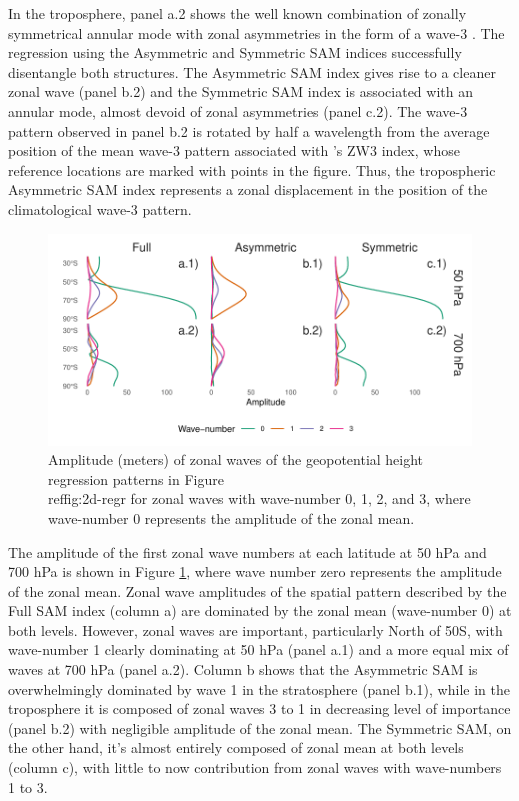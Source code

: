 \documentclass[smallextended]{svjour3}       %
\begin{document}
In the troposphere, panel a.2 shows the well known combination of zonally symmetrical annular mode with zonal asymmetries in the form of a wave-3 \citep{fogt2012}. The regression using the Asymmetric and Symmetric SAM indices successfully disentangle both structures. The Asymmetric SAM index gives rise to a cleaner zonal wave (panel b.2) and the Symmetric SAM index is associated with an annular mode, almost devoid of zonal asymmetries (panel c.2). The wave-3 pattern observed in panel b.2 is rotated by half a wavelength from the average position of the mean wave-3 pattern associated with \citet{raphael2004}'s ZW3 index, whose reference locations are marked with points in the figure. Thus, the tropospheric Asymmetric SAM index represents a zonal displacement in the position of the climatological wave-3 pattern.

\begin{figure}
\includegraphics{wave-amplitude-1} \caption{Amplitude (meters) of zonal waves of the geopotential height regression patterns in Figure \\ref{fig:2d-regr} for zonal waves with wave-number 0, 1, 2, and 3, where wave-number 0 represents the amplitude of the zonal mean.}\label{fig:wave-amplitude}
\end{figure}

The amplitude of the first zonal wave numbers at each latitude at 50 hPa and 700 hPa is shown in Figure \ref{fig:wave-amplitude}, where wave number zero represents the amplitude of the zonal mean. Zonal wave amplitudes of the spatial pattern described by the Full SAM index (column a) are dominated by the zonal mean (wave-number 0) at both levels. However, zonal waves are important, particularly North of 50\degree S, with wave-number 1 clearly dominating at 50 hPa (panel a.1) and a more equal mix of waves at 700 hPa (panel a.2). Column b shows that the Asymmetric SAM is overwhelmingly dominated by wave 1 in the stratosphere (panel b.1), while in the troposphere it is composed of zonal waves 3 to 1 in decreasing level of importance (panel b.2) with negligible amplitude of the zonal mean. The Symmetric SAM, on the other hand, it's almost entirely composed of zonal mean at both levels (column c), with little to now contribution from zonal waves with wave-numbers 1 to 3.
\end{document}
